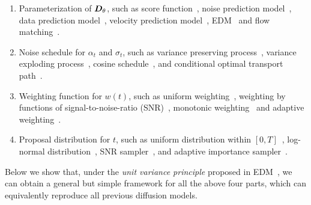 \begin{enumerate}
    \item Parameterization of ${\bm{D}}_\theta$, such as score function~\citep{song2019generative,song2020score}, noise prediction model~\citep{song2019generative,song2020score,ho2020ddpm}, data prediction model~\citep{ho2020ddpm,kingma2021vdm,salimans2022progressive}, velocity prediction model~\citep{salimans2022progressive}, EDM~\citep{karras2022edm} and flow matching~\citep{lipman2022flowmatching,rectified_flow,albergo2023stochastic_interpolants}.
    \item Noise schedule for $\alpha_t$ and $\sigma_t$, such as variance preserving process~\citep{ho2020ddpm,song2020score}, variance exploding process~\citep{song2020score,karras2022edm}, cosine schedule~\citep{nichol2021improved}, and conditional optimal transport path~\citep{lipman2022flowmatching}.
    \item Weighting function for $w(t)$, such as uniform weighting~\citep{ho2020ddpm,nichol2021improved,karras2022edm}, weighting by functions of signal-to-noise-ratio (SNR)~\citep{salimans2022progressive}, monotonic weighting~\citep{kingma2024diffusion_elbo} and adaptive weighting~\citep{karras2024edm2}.
    \item Proposal distribution for $t$, such as uniform distribution within $[0, T]$~\citep{ho2020ddpm,song2020score}, log-normal distribution~\citep{karras2022edm}, SNR sampler~\citep{esser2024sd3}, and adaptive importance sampler~\citep{song2021maximum,kingma2021vdm}.
\end{enumerate}

Below we show that, under the \textit{unit variance principle} proposed in EDM~\citep{karras2022edm}, we can obtain a general but simple framework for all the above four parts, which can equivalently reproduce all previous diffusion models.

